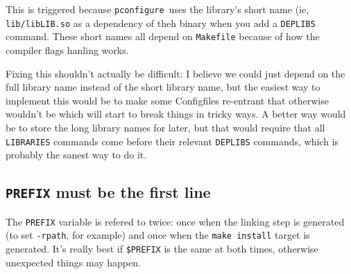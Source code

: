 \documentclass{article}
\newcommand{\pconfigure}{\texttt{pconfigure}}
\begin{document}
This is triggered because \pconfigure\ uses the library's short name
(ie, \texttt{lib/libLIB.so} as a dependency of theh binary when you
add a \texttt{DEPLIBS} command.  These short names all depend on
\texttt{Makefile} because of how the compiler flags hanling works.

Fixing this shouldn't actually be difficult: I believe we could just
depend on the full library name instead of the short library name, but
the easiest way to implement this would be to make some Configfiles
re-entrant that otherwise wouldn't be which will start to break things
in tricky ways.  A better way would be to store the long library names
for later, but that would require that all \texttt{LIBRARIES} commands
come before their relevant \texttt{DEPLIBS} commands, which is
probably the sanest way to do it.

\subsection{\texttt{PREFIX} must be the first line \label{err::prefix}}

The \texttt{PREFIX} variable is refered to twice: once when the
linking step is generated (to set \texttt{-rpath}, for example) and
once when the \texttt{make install} target is generated.  It's really
best if \texttt{\$PREFIX} is the same at both times, otherwise
unexpected things may happen.
\end{document}
